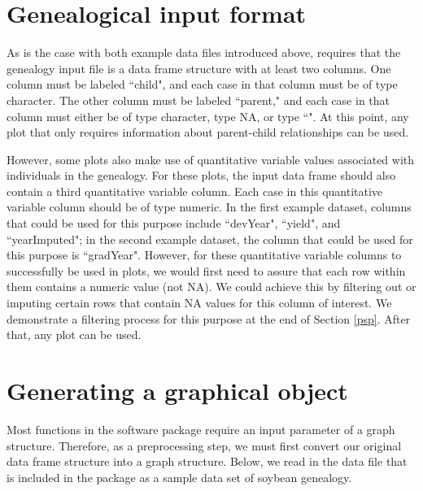 \documentclass[article,shortnames]{jss}
\begin{document}
\section{Genealogical input format}

As is the case with both example data files introduced above,  requires that the genealogy input file is a data frame structure with at least two columns. One column must be labeled ``child", and each case in that column must be of type character. The other column must be labeled ``parent," and each case in that column must either be of type character, type NA, or type ``". At this point, any  plot that only requires information about parent-child relationships can be used.

However, some  plots also make use of quantitative variable values associated with individuals in the genealogy. For these plots, the input data frame should also contain a third quantitative variable column. Each case in this quantitative variable column should be of type numeric. In the first example dataset, columns that could be used for this purpose include ``devYear", ``yield", and ``yearImputed"; in the second example dataset, the column that could be used for this purpose is ``gradYear". However, for these quantitative variable columns to successfully be used in plots, we would first need to assure that each row within them contains a numeric value (not NA). We could achieve this by filtering out or imputing certain rows that contain NA values for this column of interest. We demonstrate a filtering process for this purpose at the end of Section \ref{psp}. After that, any  plot can be used.

\section{Generating a graphical object}
\label{ggo}

Most functions in the  software package require an input parameter of a graph structure. Therefore, as a preprocessing step, we must first convert our original data frame structure into a graph structure. Below, we read in the  data file  that is included in the package as a sample data set of soybean genealogy.
\end{document}
